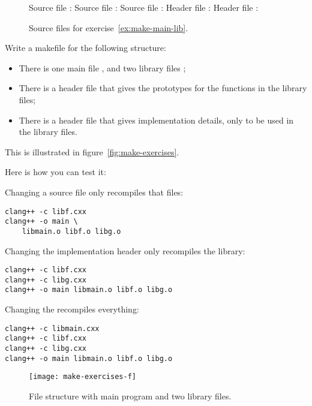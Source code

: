 \begin{figure}[t]
  \begin{multicols}{2}
    Source file :
    Source file :
    Source file :
    Header file :
    Header file :
  \end{multicols}
  \caption{Source files for exercise~\ref{ex:make-main-lib}.}
  \label{fig:make-files}
\end{figure}

\begin{exercise}
  \label{ex:make-main-lib}
  Write a makefile for the following structure:
  \begin{itemize}
  \item There is one main file , and two library files
     ;
  \item There is a header file  that gives the prototypes
    for the functions in the library files;
  \item There is a header file  that gives implementation
    details, only to be used in the library files.
  \end{itemize}
  This is illustrated in figure~\ref{fig:make-exercises}.

  Here is how you can test it:
  \begin{multicols}{2}
    \footnotesize
    Changing a source file only recompiles that files:
\begin{lstlisting}
clang++ -c libf.cxx
clang++ -o main \
    libmain.o libf.o libg.o
\end{lstlisting}
Changing the implementation header only recompiles the library:
\begin{lstlisting}
clang++ -c libf.cxx
clang++ -c libg.cxx
clang++ -o main libmain.o libf.o libg.o  
\end{lstlisting}
Changing the  recompiles everything:
\begin{lstlisting}
clang++ -c libmain.cxx
clang++ -c libf.cxx
clang++ -c libg.cxx
clang++ -o main libmain.o libf.o libg.o
\end{lstlisting}
  \end{multicols}
\end{exercise}

\begin{figure}[ht]
  \texttt{[image: make-exercises-f]}
  \caption{File structure with main program and two library files.}
  \label{fig:make-exercises-f}
\end{figure}


